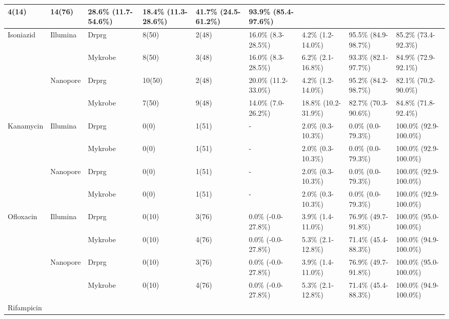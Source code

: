 \begin{table}
{\begin{tabular}{|l|l|l|l|l|l|l|l|l|}
  4(14) &
  14(76) &
  28.6\% (11.7-54.6\%) &
  18.4\% (11.3-28.6\%) &
  41.7\% (24.5-61.2\%) &
  93.9\% (85.4-97.6\%) \\ \hline
\multirow{4}{*}{Isoniazid} &
  \multirow{2}{*}{Illumina} &
  Drprg &
  8(50) &
  2(48) &
  16.0\% (8.3-28.5\%) &
  4.2\% (1.2-14.0\%) &
  95.5\% (84.9-98.7\%) &
  85.2\% (73.4-92.3\%) \\ \cline{3-9} 
 &
   &
  Mykrobe &
  8(50) &
  3(48) &
  16.0\% (8.3-28.5\%) &
  6.2\% (2.1-16.8\%) &
  93.3\% (82.1-97.7\%) &
  84.9\% (72.9-92.1\%) \\ \cline{2-9} 
 &
  \multirow{2}{*}{Nanopore} &
  Drprg &
  10(50) &
  2(48) &
  20.0\% (11.2-33.0\%) &
  4.2\% (1.2-14.0\%) &
  95.2\% (84.2-98.7\%) &
  82.1\% (70.2-90.0\%) \\ \cline{3-9} 
 &
   &
  Mykrobe &
  7(50) &
  9(48) &
  14.0\% (7.0-26.2\%) &
  18.8\% (10.2-31.9\%) &
  82.7\% (70.3-90.6\%) &
  84.8\% (71.8-92.4\%) \\ \hline
\multirow{4}{*}{Kanamycin} &
  \multirow{2}{*}{Illumina} &
  Drprg &
  0(0) &
  1(51) &
  - &
  2.0\% (0.3-10.3\%) &
  0.0\% (0.0-79.3\%) &
  100.0\% (92.9-100.0\%) \\ \cline{3-9} 
 &
   &
  Mykrobe &
  0(0) &
  1(51) &
  - &
  2.0\% (0.3-10.3\%) &
  0.0\% (0.0-79.3\%) &
  100.0\% (92.9-100.0\%) \\ \cline{2-9} 
 &
  \multirow{2}{*}{Nanopore} &
  Drprg &
  0(0) &
  1(51) &
  - &
  2.0\% (0.3-10.3\%) &
  0.0\% (0.0-79.3\%) &
  100.0\% (92.9-100.0\%) \\ \cline{3-9} 
 &
   &
  Mykrobe &
  0(0) &
  1(51) &
  - &
  2.0\% (0.3-10.3\%) &
  0.0\% (0.0-79.3\%) &
  100.0\% (92.9-100.0\%) \\ \hline
\multirow{4}{*}{Ofloxacin} &
  \multirow{2}{*}{Illumina} &
  Drprg &
  0(10) &
  3(76) &
  0.0\% (-0.0-27.8\%) &
  3.9\% (1.4-11.0\%) &
  76.9\% (49.7-91.8\%) &
  100.0\% (95.0-100.0\%) \\ \cline{3-9} 
 &
   &
  Mykrobe &
  0(10) &
  4(76) &
  0.0\% (-0.0-27.8\%) &
  5.3\% (2.1-12.8\%) &
  71.4\% (45.4-88.3\%) &
  100.0\% (94.9-100.0\%) \\ \cline{2-9} 
 &
  \multirow{2}{*}{Nanopore} &
  Drprg &
  0(10) &
  3(76) &
  0.0\% (-0.0-27.8\%) &
  3.9\% (1.4-11.0\%) &
  76.9\% (49.7-91.8\%) &
  100.0\% (95.0-100.0\%) \\ \cline{3-9} 
 &
   &
  Mykrobe &
  0(10) &
  4(76) &
  0.0\% (-0.0-27.8\%) &
  5.3\% (2.1-12.8\%) &
  71.4\% (45.4-88.3\%) &
  100.0\% (94.9-100.0\%) \\ \hline
\multirow{4}{*}{Rifampicin} &

\end{tabular}}
\end{table}
